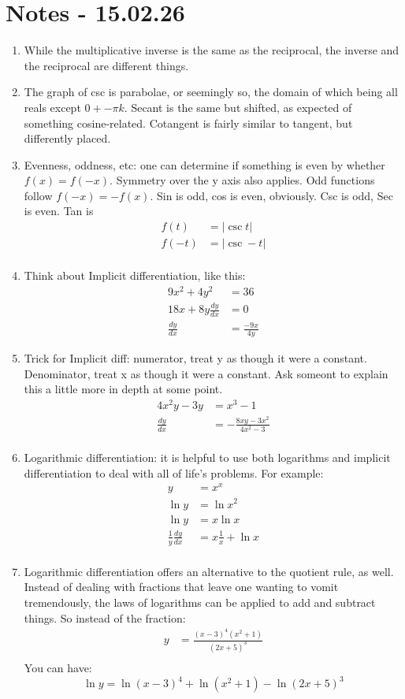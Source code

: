 \documentclass[11pt]{article}
\begin{document}
\section{Notes - 15.02.26}
\begin{enumerate}
	\item While the multiplicative inverse is the same as the reciprocal, the inverse and the reciprocal are different things.
	\item The graph of csc is parabolae, or seemingly so, the domain of which being all reals except $0 +- \pi k $.  Secant is the same but shifted, as expected of something cosine-related.  Cotangent is fairly similar to tangent, but differently placed.
	\item Evenness, oddness, etc: one can determine if something is even by whether $f(x) = f(-x)$.  Symmetry over the y axis also applies.  Odd functions follow $f(-x) = -f(x)$.  Sin is odd, cos is even, obviously.  Csc is odd, Sec is even.  Tan is 
	\begin{align*}
	f(t) &= |\csc t| \\
	f(-t) &= |\csc -t| \\
	\end{align*}
	\item Think about Implicit differentiation, like this:
	\begin{align*}
	9x^2+4y^2 &= 36 \\
	18x + 8y \frac{dy}{dx} &= 0 \\
	\frac{dy}{dx} &= \frac{-9x}{4y}
	\end{align*}
	\item Trick for Implicit diff: numerator, treat y as though it were a constant.  Denominator, treat x as though it were a constant.  Ask someont to explain this a little more in depth at some point.
	\begin{align*}
	4x^2y -3y &= x^3 - 1 \\
	\frac{dy}{dx} &= - \frac{8xy-3x^2}{4x^2-3}\\ 
	\end{align*}
	\item Logarithmic differentiation: it is helpful to use both logarithms and implicit differentiation to deal with all of life's problems.  For example:
	\begin{align*}
		y &= x^x \\
		\ln y &= \ln x^2 \\
		\ln y &= x\ln x\\
		\frac{1}{y} \frac{dy}{dx} &= x \frac{1}{x} + \ln x \\
	\end{align*}
	\item Logarithmic differentiation offers an alternative to the quotient rule, as well.  Instead of dealing with fractions that leave one wanting to vomit tremendously, the laws of logarithms can be applied to add and subtract things.  So instead of the fraction:
	\begin{align*}
		y &= \frac{(x-3)^4(x^2+1)}{(2x+5)^3} \\
	\end{align*}
	You can have:
	$$ \ln y = \ln (x-3)^4 + \ln (x^2+1) - \ln (2x+5)^3 $$
\end{enumerate}
\end{document}
